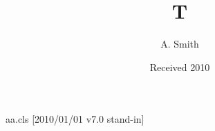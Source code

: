 \begin{filecontents*}[overwrite]{aa.cls}
[2010/01/01 v7.0 stand-in]
\def\mailname{{\it Correspondence to\/}:}
\def\email#1{{e-mail: \tt#1}}
\def\institute#1{\gdef\@institute{#1}}\def\@institute{}
\def\mail#1{\gdef\@mail{#1}}\def\@mail{}
\def\@maketitle{{\Large\@title\par}\@author\par\@institute\par
  \if!\@mail!\else\footnotetext[0]{\mailname\ \ignorespaces\@mail}\fi}
\end{filecontents*}
\documentclass{aa}

\title{T}\author{A. Smith}\date{Received 2010}
\maketitle
Body.

